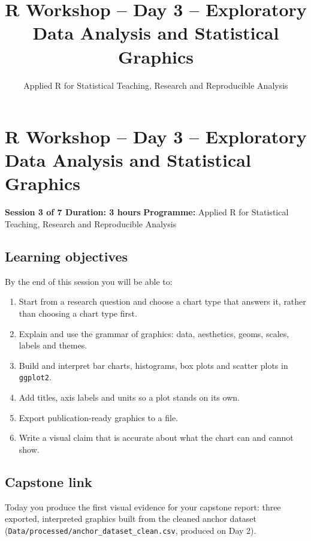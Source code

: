 \documentclass[11pt]{article}
\title{R Workshop -- Day 3 -- Exploratory Data Analysis and Statistical Graphics}
\author{Applied R for Statistical Teaching, Research and Reproducible Analysis}
\date{}
\providecommand{\tightlist}{%
  \setlength{\itemsep}{0pt}\setlength{\parskip}{0pt}}
\begin{document}
\maketitle
\tableofcontents
\newpage
\hypertarget{r-workshop-day-3-exploratory-data-analysis-and-statistical-graphics}{%
\section{R Workshop -- Day 3 -- Exploratory Data Analysis and
Statistical
Graphics}\label{r-workshop-day-3-exploratory-data-analysis-and-statistical-graphics}}

\textbf{Session 3 of 7 \textbar{} Duration: 3 hours} \textbf{Programme:}
Applied R for Statistical Teaching, Research and Reproducible Analysis

\hypertarget{learning-objectives}{%
\subsection{Learning objectives}\label{learning-objectives}}

By the end of this session you will be able to:

\begin{enumerate}
\def\labelenumi{\arabic{enumi}.}
\tightlist
\item
  Start from a research question and choose a chart type that answers
  it, rather than choosing a chart type first.
\item
  Explain and use the grammar of graphics: data, aesthetics, geoms,
  scales, labels and themes.
\item
  Build and interpret bar charts, histograms, box plots and scatter
  plots in \texttt{ggplot2}.
\item
  Add titles, axis labels and units so a plot stands on its own.
\item
  Export publication-ready graphics to a file.
\item
  Write a visual claim that is accurate about what the chart can and
  cannot show.
\end{enumerate}

\hypertarget{capstone-link}{%
\subsection{Capstone link}\label{capstone-link}}

Today you produce the first visual evidence for your capstone report:
three exported, interpreted graphics built from the cleaned anchor
dataset (\texttt{Data/processed/anchor\_dataset\_clean.csv}, produced on
Day 2).
\end{document}
